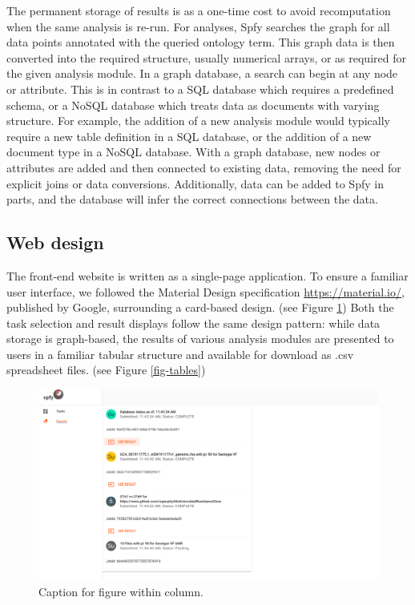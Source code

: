 \documentclass{article}
\begin{document}
The permanent storage of results is as a one-time cost to avoid recomputation when the same analysis is re-run. For analyses, Spfy searches the graph for all data points annotated with the queried ontology term. This graph data is then converted into the required structure, usually numerical arrays, or as required for the given analysis module.
In a graph database, a search can begin at any node or attribute. This is in contrast to a SQL database which requires a predefined schema, or a NoSQL database which treats data as documents with varying structure.
For example, the addition of a new analysis module would typically require a new table definition in a SQL database, or the addition of a new document type in a NoSQL database. With a graph database, new nodes or attributes are added and then connected to existing data, removing the need for explicit joins or data conversions. Additionally, data can be added to Spfy in parts, and the database will infer the correct connections between the data.

\subsection{Web design}

The front-end website is written as a single-page application.
To ensure a familiar user interface, we followed the Material Design specification \url{https://material.io/}, published by Google, surrounding a card-based design.
(see Figure \ref{fig-results})
Both the task selection and result displays follow the same design pattern: while data storage is graph-based, the results of various analysis modules are presented to users in a familiar tabular structure and available for download as .csv spreadsheet files.
(see Figure \ref{fig-tables})

\begin{figure}[!hb]
\begin{center}
\includegraphics[width=\textwidth]{images/results.png}
\end{center}
\caption{Caption for figure within column.}
\label{fig-results}
\end{figure}
\end{document}
